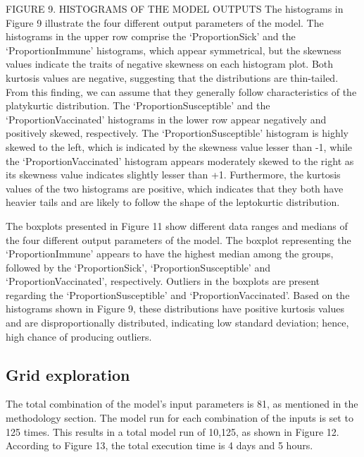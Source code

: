 \documentclass[smallextended]{svjour3}       %
\begin{document}
FIGURE 9. HISTOGRAMS OF THE MODEL OUTPUTS
The histograms in Figure 9 illustrate the four different output parameters of the model. The histograms in the upper row comprise the ‘ProportionSick’ and the ‘ProportionImmune’ histograms, which appear symmetrical, but the skewness values indicate the traits of negative skewness on each histogram plot. Both kurtosis values are negative, suggesting that the distributions are thin-tailed. From this finding, we can assume that they generally follow characteristics of the platykurtic distribution. The ‘ProportionSusceptible’ and the ‘ProportionVaccinated’ histograms in the lower row appear negatively and positively skewed, respectively. The ‘ProportionSusceptible’ histogram is highly skewed to the left, which is indicated by the skewness value lesser than -1, while the ‘ProportionVaccinated’ histogram appears moderately skewed to the right as its skewness value indicates slightly lesser than +1. Furthermore, the kurtosis values of the two histograms are positive, which indicates that they both have heavier tails and are likely to follow the shape of the leptokurtic distribution.

The boxplots presented in Figure 11 show different data ranges and medians of the four different output parameters of the model. The boxplot representing the ‘ProportionImmune’ appears to have the highest median among the groups, followed by the ‘ProportionSick’, ‘ProportionSusceptible’ and ‘ProportionVaccinated’, respectively. Outliers in the boxplots are present regarding the ‘ProportionSusceptible’ and ‘ProportionVaccinated’. Based on the histograms shown in Figure 9, these distributions have positive kurtosis values and are disproportionally distributed, indicating low standard deviation; hence, high chance of producing outliers.


\subsection{Grid exploration}

The total combination of the model's input parameters is 81, as mentioned in the methodology section. The model run for each combination of the inputs is set to 125 times. This results in a total model run of 10,125, as shown in Figure 12.
According to Figure 13, the total execution time is 4 days and 5 hours.
\end{document}
